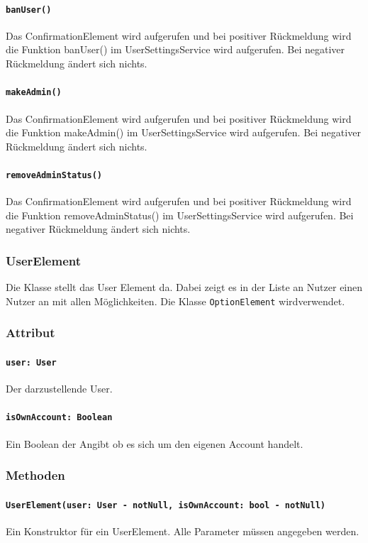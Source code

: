 \documentclass[parskip=full]{scrartcl}
\begin{document}
            \paragraph*{\texttt{banUser()}} Das ConfirmationElement wird aufgerufen und bei positiver Rückmeldung wird die Funktion banUser() im UserSettingsService wird aufgerufen. Bei negativer Rückmeldung ändert sich nichts.
            \paragraph*{\texttt{makeAdmin()}} Das ConfirmationElement wird aufgerufen und bei positiver Rückmeldung wird die Funktion makeAdmin() im UserSettingsService wird aufgerufen. Bei negativer Rückmeldung ändert sich nichts.
            \paragraph*{\texttt{removeAdminStatus()}} Das ConfirmationElement wird aufgerufen und bei positiver Rückmeldung wird die Funktion removeAdminStatus() im UserSettingsService wird aufgerufen. Bei negativer Rückmeldung ändert sich nichts.

    \subsubsection{UserElement} 
        Die Klasse stellt das User Element da. Dabei zeigt es in der Liste an Nutzer einen Nutzer an mit allen Möglichkeiten. Die Klasse \texttt{OptionElement} wirdverwendet.
        \subsubsection*{Attribut}
            \paragraph*{\texttt{user: User}} Der darzustellende User.
            \paragraph*{\texttt{isOwnAccount: Boolean}} Ein Boolean der Angibt ob es sich um den eigenen Account handelt.

        \subsubsection*{Methoden}
            \paragraph*{\texttt{UserElement(user: User - notNull, isOwnAccount: bool - notNull)}} Ein Konstruktor für ein UserElement. Alle Parameter müssen angegeben werden.
\end{document}
